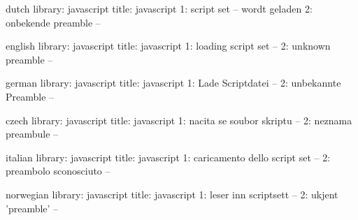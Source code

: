 



 

\unprotect


\startmessages  dutch  library: javascript
  title: javascript
      1: script set -- wordt geladen
      2: onbekende preamble --
\stopmessages

\startmessages  english  library: javascript
  title: javascript
      1: loading script set --
      2: unknown preamble --
\stopmessages

\startmessages  german  library: javascript
  title: javascript
      1: Lade Scriptdatei --
      2: unbekannte Preamble --
\stopmessages

\startmessages  czech  library: javascript
  title: javascript
      1: nacita se soubor skriptu --
      2: neznama preambule --
\stopmessages

\startmessages  italian  library: javascript
  title: javascript
      1: caricamento dello script set --
      2: preambolo sconosciuto --
\stopmessages

\startmessages  norwegian library: javascript
  title: javascript
      1: leser inn scriptsett --
      2: ukjent 'preamble' --
\stopmessages


